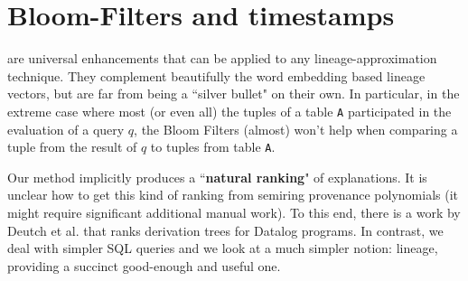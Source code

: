 \section{Bloom-Filters and timestamps} are universal enhancements that can be applied to any lineage-approximation technique. They complement beautifully the word embedding based lineage vectors, but are far from being a ``silver bullet" on their own.
In particular, in the extreme case where most (or even all) the tuples of a table \texttt{A} participated in the evaluation of a query $q$, the Bloom Filters (almost) won't help when comparing a tuple from the result of $q$ to tuples from table \texttt{A}.

Our method implicitly produces a ``\textbf{natural ranking}" of explanations. It is unclear how to get this kind of ranking from semiring provenance polynomials (it might require significant additional manual work). To this end, there is a work by Deutch et al. \cite{Deutch2015} that ranks derivation trees for Datalog programs. In contrast, we deal with simpler SQL queries and we look at a much simpler notion: lineage, providing a succinct good-enough and useful one.